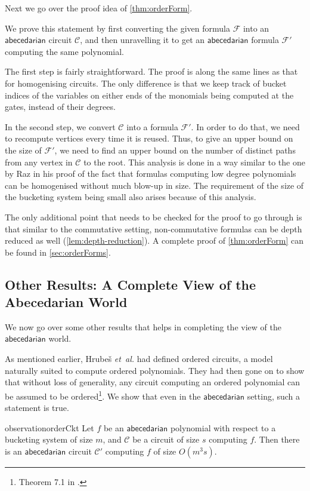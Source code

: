 \documentclass[10pt,a4paper]{article}
\def\etal{\emph{et~al.}}
\def\Hrubes{Hrube{\v{s}}}
\newcommand{\ckt}{\textbf{$\mathcal{C}$}}
\newcommand{\form}{\textbf{$\mathcal{F}$}}
\newcommand{\abcd}{\mathsf{abecedarian}}
\begin{document}
Next we go over the proof idea of \autoref{thm:orderForm}.

\orderForm*

We prove this statement by first converting the given formula $\form$ into an $\abcd$ circuit $\ckt$, and then unravelling it to get an $\abcd$ formula $\form'$ computing the same polynomial.

The first step is fairly straightforward. 
The proof is along the same lines as that for homogenising circuits.
The only difference is that we keep track of bucket indices of the variables on either ends of the monomials being computed at the gates, instead of their degrees. 

In the second step, we convert $\ckt$ into a formula $\form'$.
In order to do that, we need to recompute vertices every time it is reused.
Thus, to give an upper bound on the size of $\form'$, we need to find an upper bound on the number of distinct paths from any vertex in $\ckt$ to the root.
This analysis is done in a way similar to the one by Raz \cite{R13} in his proof of the fact that formulas computing low degree polynomials can be homogenised without much blow-up in size.
The requirement of the size of the bucketing system being small also arises because of this analysis.

The only additional point that needs to be checked for the proof to go through is that similar to the commutative setting, non-commutative formulas can be depth reduced as well (\autoref{lem:depth-reduction}).
A complete proof of \autoref{thm:orderForm} can be found in \autoref{sec:orderForms}.


\subsection{Other Results: A Complete View of the Abecedarian World}

We now go over some other results that helps in completing the view of the $\abcd$ world.

As mentioned earlier, {\Hrubes} {\etal} \cite{HWY11} had defined ordered circuits, a model naturally suited to compute ordered polynomials. 
They had then gone on to show that without loss of generality, any circuit computing an ordered polynomial can be assumed to be ordered\footnote{Theorem 7.1 in \cite{HWY11}.}. 
We show that even in the $\abcd$ setting, such a statement is true.

\begin{restatable}{observation}{orderCkt}\label{obs:orderCkt}
	Let $f$ be an $\abcd$ polynomial with respect to a bucketing system of size $m$, and $\ckt$ be a circuit of size $s$ computing $f$. 
	Then there is an $\abcd$ circuit $\ckt'$ computing $f$ of size $O(m^3s)$.
\end{restatable}
\end{document}
